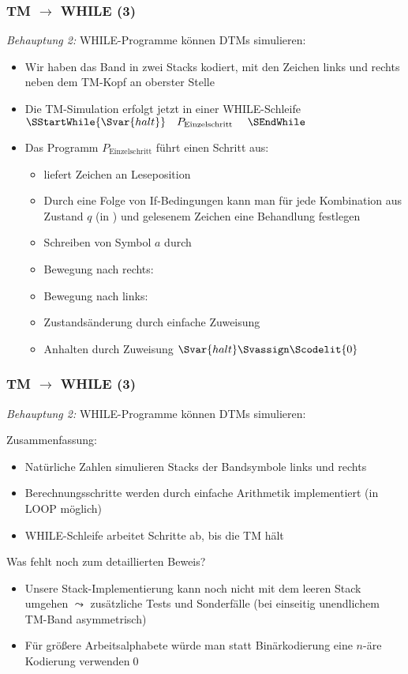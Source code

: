 \documentclass[aspectratio=1610,onlymath]{beamer}
\begin{document}
\begin{frame}[t]\frametitle{TM $\to$ WHILE (3)}

\emph{Behauptung 2:} WHILE-Programme können DTMs simulieren:
\medskip

\begin{itemize}
\item Wir haben das Band in zwei Stacks kodiert, mit den Zeichen links und rechts neben dem TM-Kopf an oberster Stelle\pause
\item Die TM-Simulation erfolgt jetzt in einer WHILE-Schleife
	$\SStartWhile{\Svar{halt}} \quad P_{\text{Einzelschritt}}~\quad \SEndWhile$
\item Das Programm $P_{\text{Einzelschritt}}$ führt einen Schritt aus:
\begin{itemize}
\item {} liefert Zeichen an Leseposition
\item Durch eine Folge von If-Bedingungen kann man für jede Kombination aus
Zustand $q$ (in ) und gelesenem Zeichen eine Behandlung festlegen
\item Schreiben von Symbol $a$ durch 
\item Bewegung nach rechts: 
\item Bewegung nach links: 
\item Zustandsänderung durch einfache Zuweisung
\item Anhalten durch Zuweisung $\Svar{halt}\Svassign\Scodelit{0}$
\end{itemize}
\end{itemize}

\end{frame}

\begin{frame}[t]\frametitle{TM $\to$ WHILE (3)}

\emph{Behauptung 2:} WHILE-Programme können DTMs simulieren:
\medskip

\alert{Zusammenfassung:}
\begin{itemize}
\item Natürliche Zahlen simulieren Stacks der Bandsymbole links und rechts
\item Berechnungsschritte werden durch einfache Arithmetik implementiert (in LOOP möglich)
\item WHILE-Schleife arbeitet Schritte ab, bis die TM hält
\end{itemize}
\medskip

\alert{Was fehlt noch zum detaillierten Beweis?}
\begin{itemize}
\item Unsere Stack-Implementierung kann noch nicht mit dem leeren Stack umgehen $\leadsto$ zusätzliche Tests und Sonderfälle (bei einseitig unendlichem TM-Band asymmetrisch)
\item Für größere Arbeitsalphabete würde man statt Binärkodierung eine $n$-äre Kodierung verwenden\qed
\end{itemize}

\end{frame}
\end{document}
